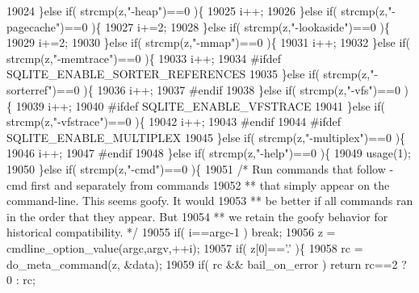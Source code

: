 \begin{DoxyCode}
{{{{{{{{19024     \}\textcolor{keywordflow}{else} \textcolor{keywordflow}{if}( strcmp(z,\textcolor{stringliteral}{"-heap"})==0 )\{
19025       i++;
19026     \}\textcolor{keywordflow}{else} \textcolor{keywordflow}{if}( strcmp(z,\textcolor{stringliteral}{"-pagecache"})==0 )\{
19027       i+=2;
19028     \}\textcolor{keywordflow}{else} \textcolor{keywordflow}{if}( strcmp(z,\textcolor{stringliteral}{"-lookaside"})==0 )\{
19029       i+=2;
19030     \}\textcolor{keywordflow}{else} \textcolor{keywordflow}{if}( strcmp(z,\textcolor{stringliteral}{"-mmap"})==0 )\{
19031       i++;
19032     \}\textcolor{keywordflow}{else} \textcolor{keywordflow}{if}( strcmp(z,\textcolor{stringliteral}{"-memtrace"})==0 )\{
19033       i++;
19034 \textcolor{preprocessor}{#ifdef SQLITE\_ENABLE\_SORTER\_REFERENCES}
19035     \}\textcolor{keywordflow}{else} \textcolor{keywordflow}{if}( strcmp(z,\textcolor{stringliteral}{"-sorterref"})==0 )\{
19036       i++;
19037 \textcolor{preprocessor}{#endif}
19038     \}\textcolor{keywordflow}{else} \textcolor{keywordflow}{if}( strcmp(z,\textcolor{stringliteral}{"-vfs"})==0 )\{
19039       i++;
19040 \textcolor{preprocessor}{#ifdef SQLITE\_ENABLE\_VFSTRACE}
19041     \}\textcolor{keywordflow}{else} \textcolor{keywordflow}{if}( strcmp(z,\textcolor{stringliteral}{"-vfstrace"})==0 )\{
19042       i++;
19043 \textcolor{preprocessor}{#endif}
19044 \textcolor{preprocessor}{#ifdef SQLITE\_ENABLE\_MULTIPLEX}
19045     \}\textcolor{keywordflow}{else} \textcolor{keywordflow}{if}( strcmp(z,\textcolor{stringliteral}{"-multiplex"})==0 )\{
19046       i++;
19047 \textcolor{preprocessor}{#endif}
19048     \}\textcolor{keywordflow}{else} \textcolor{keywordflow}{if}( strcmp(z,\textcolor{stringliteral}{"-help"})==0 )\{
19049       usage(1);
19050     \}\textcolor{keywordflow}{else} \textcolor{keywordflow}{if}( strcmp(z,\textcolor{stringliteral}{"-cmd"})==0 )\{
19051       \textcolor{comment}{/* Run commands that follow -cmd first and separately from commands}
19052 \textcolor{comment}{      ** that simply appear on the command-line.  This seems goofy.  It would}
19053 \textcolor{comment}{      ** be better if all commands ran in the order that they appear.  But}
19054 \textcolor{comment}{      ** we retain the goofy behavior for historical compatibility. */}
19055       \textcolor{keywordflow}{if}( i==argc-1 ) \textcolor{keywordflow}{break};
19056       z = cmdline_option_value(argc,argv,++i);
19057       \textcolor{keywordflow}{if}( z[0]==\textcolor{charliteral}{'.'} )\{
19058         rc = do_meta_command(z, &data);
19059         \textcolor{keywordflow}{if}( rc && bail_on_error ) \textcolor{keywordflow}{return} rc==2 ? 0 : rc;
}}}}}}}}
\end{DoxyCode}
